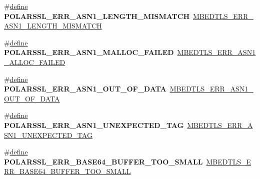 \begin{DoxyCompactItemize}
\item 
\mbox{\label{compat-1_83_8h_affc1c105d348cf2be47a2c8d6ab5ef63}} 
\#\hyperlink{structdefine}{define} {\bfseries P\+O\+L\+A\+R\+S\+S\+L\+\_\+\+E\+R\+R\+\_\+\+A\+S\+N1\+\_\+\+L\+E\+N\+G\+T\+H\+\_\+\+M\+I\+S\+M\+A\+T\+CH}~\hyperlink{group__asn1__module_gacf6fad8d80fa050c3463539412674a20}{M\+B\+E\+D\+T\+L\+S\+\_\+\+E\+R\+R\+\_\+\+A\+S\+N1\+\_\+\+L\+E\+N\+G\+T\+H\+\_\+\+M\+I\+S\+M\+A\+T\+CH}
\item 
\mbox{\label{compat-1_83_8h_a37e8d5745c2724e7330566921ca16fec}} 
\#\hyperlink{structdefine}{define} {\bfseries P\+O\+L\+A\+R\+S\+S\+L\+\_\+\+E\+R\+R\+\_\+\+A\+S\+N1\+\_\+\+M\+A\+L\+L\+O\+C\+\_\+\+F\+A\+I\+L\+ED}~\hyperlink{group__asn1__module_gab7d40360e48e414ffa1a4df1961723d2}{M\+B\+E\+D\+T\+L\+S\+\_\+\+E\+R\+R\+\_\+\+A\+S\+N1\+\_\+\+A\+L\+L\+O\+C\+\_\+\+F\+A\+I\+L\+ED}
\item 
\mbox{\label{compat-1_83_8h_a0274145c2843f1d22cf7ca9b7ed37bab}} 
\#\hyperlink{structdefine}{define} {\bfseries P\+O\+L\+A\+R\+S\+S\+L\+\_\+\+E\+R\+R\+\_\+\+A\+S\+N1\+\_\+\+O\+U\+T\+\_\+\+O\+F\+\_\+\+D\+A\+TA}~\hyperlink{group__asn1__module_ga284c12cf03a4ffeee89a63750f00dfdd}{M\+B\+E\+D\+T\+L\+S\+\_\+\+E\+R\+R\+\_\+\+A\+S\+N1\+\_\+\+O\+U\+T\+\_\+\+O\+F\+\_\+\+D\+A\+TA}
\item 
\mbox{\label{compat-1_83_8h_a171798e67a7a1024ab5e1c12c73f0537}} 
\#\hyperlink{structdefine}{define} {\bfseries P\+O\+L\+A\+R\+S\+S\+L\+\_\+\+E\+R\+R\+\_\+\+A\+S\+N1\+\_\+\+U\+N\+E\+X\+P\+E\+C\+T\+E\+D\+\_\+\+T\+AG}~\hyperlink{group__asn1__module_gab055945fda47ad0e16dc59f8c5ecb86e}{M\+B\+E\+D\+T\+L\+S\+\_\+\+E\+R\+R\+\_\+\+A\+S\+N1\+\_\+\+U\+N\+E\+X\+P\+E\+C\+T\+E\+D\+\_\+\+T\+AG}
\item 
\mbox{\label{compat-1_83_8h_a9a778cc91797eec1df0548e1f4afd997}} 
\#\hyperlink{structdefine}{define} {\bfseries P\+O\+L\+A\+R\+S\+S\+L\+\_\+\+E\+R\+R\+\_\+\+B\+A\+S\+E64\+\_\+\+B\+U\+F\+F\+E\+R\+\_\+\+T\+O\+O\+\_\+\+S\+M\+A\+LL}~\hyperlink{base64_8h_aee2d8e14fac7a47751514356572b97e5}{M\+B\+E\+D\+T\+L\+S\+\_\+\+E\+R\+R\+\_\+\+B\+A\+S\+E64\+\_\+\+B\+U\+F\+F\+E\+R\+\_\+\+T\+O\+O\+\_\+\+S\+M\+A\+LL}
\item 
\mbox{\label{compat-1_83_8h_a8fac8bb4d3ed57b1beb10bf617664a1d}} 

\end{DoxyCompactItemize}
